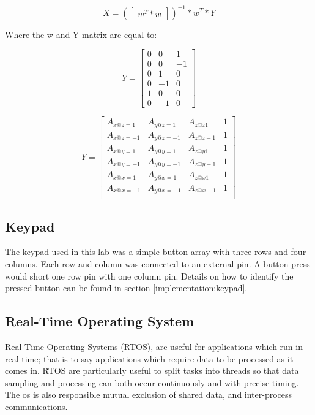 \documentclass[12pt]{article}
\begin{document}
\begin{equation} \label{cal_eq:2}
 X = (\begin{bmatrix} w^{T}*w \end{bmatrix})^{-1}*w^{T} * Y
 \end{equation}

Where the w and Y matrix are equal to:

\begin{equation} \label{cal_eq:3}
 Y = \begin{bmatrix} 0 & 0 & 1  \\
            0 & 0 & -1 \\
                      0 & 1 & 0  \\
                      0 & -1 & 0 \\
                      1 & 0 & 0  \\
                      0 & -1 & 0
                      \end{bmatrix}
\end{equation}

\begin{equation} \label{cal_eq:4}
 Y = \begin{bmatrix} A_{x@z=1} & A_{y@z=1} & A_{z@z1} & 1 \\
            A_{x@z=-1} & A_{y@z=-1} & A_{z@z-1} & 1 \\
                      A_{x@y=1} & A_{y@y=1} & A_{z@y1} & 1 \\
                      A_{x@y=-1} & A_{y@y=-1} & A_{z@y-1} & 1 \\
                      A_{x@x=1} & A_{y@x=1} & A_{z@x1} & 1 \\
                      A_{x@x=-1} & A_{y@x=-1} & A_{z@x-1} & 1 \\
                      \end{bmatrix}
\end{equation}
\subsection{Keypad}
The keypad used in this lab was a simple button array with three rows and four columns. Each row and column was connected to an external pin. A button press would short one row pin with one column pin. Details on how to identify the pressed button can be found in section \ref{implementation:keypad}.


\subsection{Real-Time Operating System}
Real-Time Operating Systems (RTOS), are useful for applications which run in real time; that is to say applications which require data to be processed as it comes in. RTOS are particularly useful to split tasks into threads so that data sampling and processing can both occur continuously and with precise timing. The os is also responsible mutual exclusion of shared data, and inter-process communications.
\end{document}
